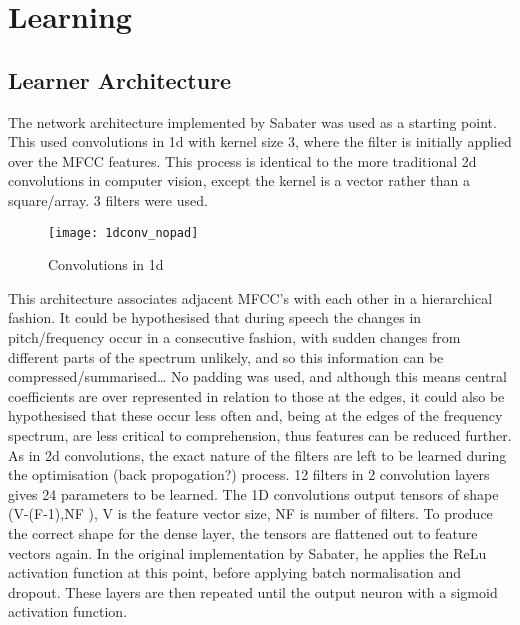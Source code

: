 
\chapter{Learning} %

\label{Chapter3} %


\section{Learner Architecture}
The network architecture implemented by Sabater was used as a starting point. This used convolutions in 1d with kernel size 3, where the filter is initially applied over the MFCC features. This process is identical to the more traditional 2d convolutions in computer vision, except the kernel is a vector rather than a square/array. 3 filters were used.
\begin{wrapfigure}{r}{0.3\textwidth} 
	\texttt{[image: 1dconv\_nopad]}
	\caption{Convolutions in 1d \cite{catalunya_2017}}
	\label{1dconv}
\end{wrapfigure}
This architecture associates adjacent MFCC’s with each other in a hierarchical fashion. It could be hypothesised that during speech the changes in pitch/frequency occur in a consecutive fashion, with sudden changes from different parts of the spectrum unlikely, and so this information can be compressed/summarised… No padding was used, and although this means central coefficients are over represented in relation to those at the edges, it could also be hypothesised that these occur less often and, being at the edges of the frequency spectrum, are less critical to comprehension, thus features can be reduced further. As in 2d convolutions, the exact nature of the filters are left to be learned during the optimisation (back propogation?) process. 12 filters in 2 convolution layers gives 24 parameters to be learned.
The 1D convolutions output tensors of shape (V-(F-1),NF ), V is the feature vector size, NF is number of filters. To produce the correct shape for the dense layer, the tensors are flattened out to feature vectors again. In the original implementation by Sabater, he applies the ReLu activation function at this point, before applying batch normalisation and dropout. These layers are then repeated until the output neuron with a sigmoid activation function. 
